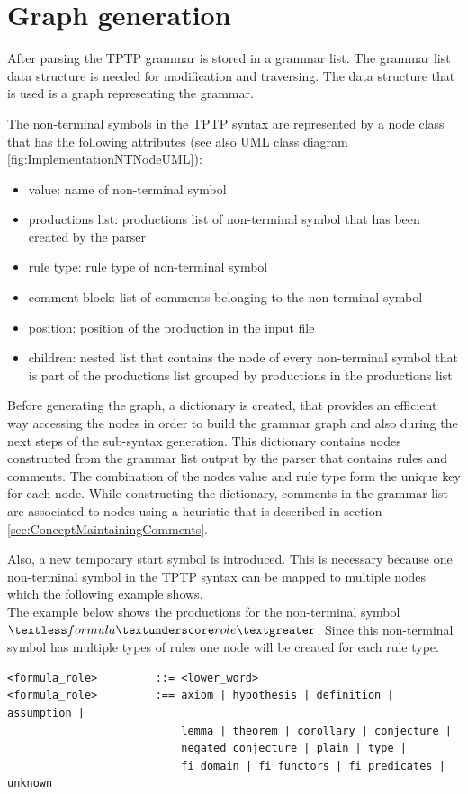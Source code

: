 \section{Graph generation}\label{sec:ConceptGraphGeneration}

After parsing the \ac{TPTP} grammar is stored in a grammar list. The grammar list data structure is needed for modification and traversing.
The data structure that is used is a graph representing the grammar.

The non-terminal symbols in the \ac{TPTP} syntax are represented by a node class that has the following attributes (see also UML class diagram \ref{fig:ImplementationNTNodeUML}):
\begin{itemize}
\item value: name of non-terminal symbol
\item productions list: productions list of non-terminal symbol that has been created by the parser
\item rule type: rule type of non-terminal symbol
\item comment block: list of comments belonging to the non-terminal symbol
\item position: position of the production in the input file
\item children: nested list that contains the node of every non-terminal symbol that is part of the productions list grouped by productions in the productions list
\end{itemize}

Before generating the graph, a dictionary is created, that provides an efficient way accessing the nodes in order to build the grammar graph and also during the next steps of the sub-syntax generation.
This dictionary contains nodes constructed from the grammar list output by the parser that contains rules and comments. The combination of the nodes value and rule type form the unique key for each node. While constructing the dictionary, comments in the grammar list are associated to nodes using a heuristic that is described in section \ref{sec:ConceptMaintainingComments}.

Also, a new temporary start symbol is introduced.
This is necessary because one non-terminal symbol in the \ac{TPTP} syntax can be mapped to multiple nodes which the following example shows. \\
The example below shows the productions for the non-terminal symbol $\textless formula\textunderscore role\textgreater$.
Since this non-terminal symbol has multiple types of rules one node will be created for each rule type.
\begin{lstlisting}[caption= Productions of the non-terminal symbol $\textless formula\textunderscore role\textgreater$]
<formula_role>         ::= <lower_word>
<formula_role>         :== axiom | hypothesis | definition | assumption |
                           lemma | theorem | corollary | conjecture |
                           negated_conjecture | plain | type |
                           fi_domain | fi_functors | fi_predicates | unknown
\end{lstlisting}

